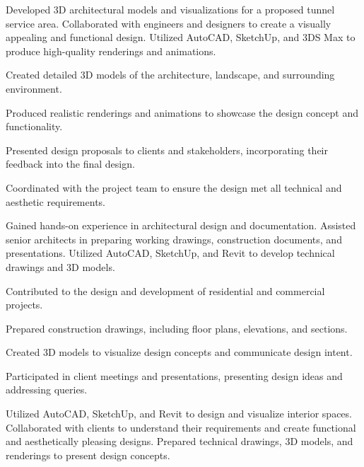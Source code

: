 \betweenSummaryPointsVSpace
Developed 3D architectural models and visualizations for a proposed tunnel service area. Collaborated with engineers and designers to create a visually appealing and functional design. Utilized AutoCAD, SketchUp, and 3DS Max to produce high-quality renderings and animations.
\begin{tightemize}
\item Created detailed 3D models of the architecture, landscape, and surrounding environment.
\item Produced realistic renderings and animations to showcase the design concept and functionality.
\item Presented design proposals to clients and stakeholders, incorporating their feedback into the final design.
\item Coordinated with the project team to ensure the design met all technical and aesthetic requirements.
\end{tightemize}
\betweenProjectsVSpace
{}
\betweenSummaryPointsVSpace
Gained hands-on experience in architectural design and documentation. Assisted senior architects in preparing working drawings, construction documents, and presentations. Utilized AutoCAD, SketchUp, and Revit to develop technical drawings and 3D models.
\begin{tightemize}
\item Contributed to the design and development of residential and commercial projects.
\item Prepared construction drawings, including floor plans, elevations, and sections.
\item Created 3D models to visualize design concepts and communicate design intent.
\item Participated in client meetings and presentations, presenting design ideas and addressing queries.
\end{tightemize}
\betweenProjectsVSpace
{}
\betweenSummaryPointsVSpace
Utilized AutoCAD, SketchUp, and Revit to design and visualize interior spaces. Collaborated with clients to understand their requirements and create functional and aesthetically pleasing designs. Prepared technical drawings, 3D models, and renderings to present design concepts.
